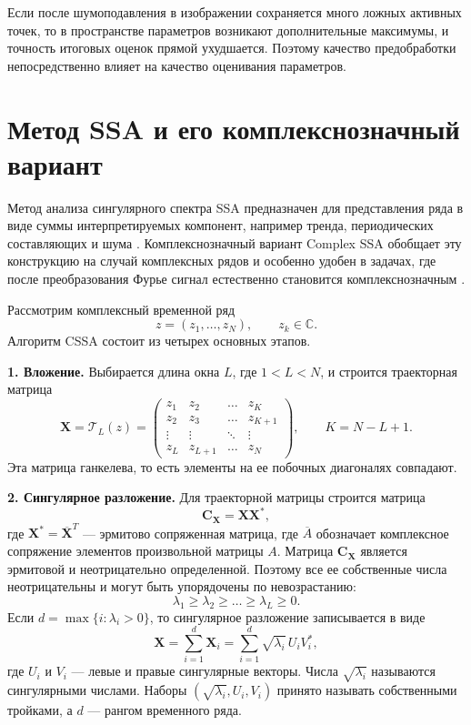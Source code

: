 Если после шумоподавления в изображении сохраняется много ложных активных
точек, то в пространстве параметров возникают дополнительные максимумы, и
точность итоговых оценок прямой ухудшается. Поэтому качество предобработки
непосредственно влияет на качество оценивания параметров.

\section{Метод SSA и его комплекснозначный вариант}

Метод анализа сингулярного спектра SSA предназначен для представления ряда в
виде суммы интерпретируемых компонент, например тренда, периодических
составляющих и шума \cite{ts_structure,ssa_with_r}. Комплекснозначный вариант
Complex SSA обобщает эту конструкцию на случай комплексных рядов и особенно
удобен в задачах, где после преобразования Фурье сигнал естественно становится
комплекснозначным \cite{zhornikova2016}.

Рассмотрим комплексный временной ряд
\[
z = (z_1,\dots,z_N), \qquad z_k \in \mathbb{C}.
\]
Алгоритм CSSA состоит из четырех основных этапов.

\textbf{1. Вложение.}
Выбирается длина окна $L$, где $1 < L < N$, и строится траекторная матрица
\[
\mathbf{X} = \mathcal{T}_L(z) =
\begin{pmatrix}
	z_1 & z_2 & \dots & z_K \\
	z_2 & z_3 & \dots & z_{K+1} \\
	\vdots & \vdots & \ddots & \vdots \\
	z_L & z_{L+1} & \dots & z_N
\end{pmatrix},
\qquad K = N-L+1.
\]
Эта матрица ганкелева, то есть элементы на ее побочных диагоналях совпадают.

\textbf{2. Сингулярное разложение.}
Для траекторной матрицы строится матрица
\[
\mathbf{C}_{\mathbf{X}} = \mathbf{X}\mathbf{X}^{*},
\]
где $\mathbf{X}^{*} = \overline{\mathbf{X}}^{T}$ --- эрмитово сопряженная
матрица, где $\overline{A}$ обозначает комплексное сопряжение элементов
произвольной матрицы $A$. Матрица $\mathbf{C}_{\mathbf{X}}$ является эрмитовой
и неотрицательно определенной. Поэтому все ее собственные числа неотрицательны
и могут быть упорядочены по невозрастанию:
\[
\lambda_1 \ge \lambda_2 \ge \dots \ge \lambda_L \ge 0.
\]
Если $d=\max\{i\colon \lambda_i>0\}$, то сингулярное разложение записывается
в виде
\[
\mathbf{X} = \sum_{i=1}^{d}\mathbf{X}_i
=
\sum_{i=1}^{d}\sqrt{\lambda_i}\,U_iV_i^{*},
\]
где $U_i$ и $V_i$ --- левые и правые сингулярные векторы. Числа
$\sqrt{\lambda_i}$ называются сингулярными числами. Наборы
$(\sqrt{\lambda_i},U_i,V_i)$ принято называть собственными тройками, а $d$ ---
рангом временного ряда.

